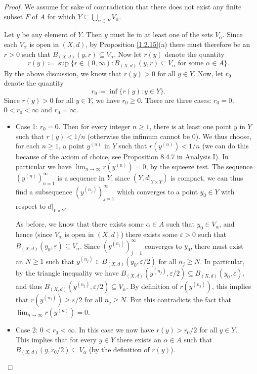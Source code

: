 \begin{proof}
    We assume for sake of contradiction that there does not exist any finite subset \(F\) of \(A\) for which \(Y \subseteq \bigcup_{\alpha \in F} V_{\alpha}\).

    Let \(y\) be any element of \(Y\).
    Then \(y\) must lie in at least one of the sets \(V_{\alpha}\).
    Since each \(V_{\alpha}\) is open in \((X, d)\), by Proposition \ref{1.2.15}(a) there must therefore be an \(r > 0\) such that \(B_{(X, d)}(y, r) \subseteq V_{\alpha}\).
    Now let \(r(y)\) denote the quantity
    \[
        r(y) \coloneqq \sup\big\{r \in (0, \infty) : B_{(X, d)}(y, r) \subseteq V_{\alpha} \text{ for some } \alpha \in A\big\}.
    \]
    By the above discussion, we know that \(r(y) > 0\) for all \(y \in Y\).
    Now, let \(r_0\) denote the quantity
    \[
        r_0 \coloneqq \inf\big\{r(y) : y \in Y\big\}.
    \]
    Since \(r(y) > 0\) for all \(y \in Y\), we have \(r_0 \geq 0\).
    There are three cases: \(r_0 = 0\), \(0 < r_0 < \infty\) and \(r_0 = \infty\).
    \begin{itemize}
        \item Case 1:
              \(r_0 = 0\).
              Then for every integer \(n \geq 1\), there is at least one point \(y\) in \(Y\) such that \(r(y) < 1 / n\) (otherwise the infimum cannot be \(0\)).
              We thus choose, for each \(n \geq 1\), a point \(y^{(n)}\) in \(Y\) such that \(r(y^{(n)}) < 1 / n\)
              (we can do this because of the axiom of choice, see Proposition 8.4.7 in Analysis I).
              In particular we have \(\lim_{n \to \infty} r(y^{(n)}) = 0\), by the squeeze test.
              The sequence \((y^{(n)})_{n = 1}^\infty\) is a sequence in \(Y\);
              since \((Y, d|_{Y \times Y})\) is compact, we can thus find a subsequence \((y^{(n_j)})_{j = 1}^\infty\) which converges to a point \(y_0 \in Y\) with respect to \(d|_{Y \times Y}\).

              As before, we know that there exists some \(\alpha \in A\) such that \(y_0 \in V_{\alpha}\), and hence (since \(V_{\alpha}\) is open in \((X, d)\)) there exists some \(\varepsilon > 0\) such that \(B_{(X, d)}(y_0, \varepsilon) \subseteq V_{\alpha}\).
              Since \((y^{(n_j)})_{j = 1}^\infty\) converges to \(y_0\), there must exist an \(N \geq 1\) such that \(y^{(n_j)} \in B_{(X, d)}(y_0, \varepsilon / 2)\) for all \(n_j \geq N\).
              In particular, by the triangle inequality we have \(B_{(X, d)}(y^{(n_j)}, \varepsilon / 2) \subseteq B_{(X, d)}(y_0, \varepsilon)\), and thus \(B_{(X, d)}(y^{(n_j)}, \varepsilon / 2) \subseteq V_{\alpha}\).
              By definition of \(r(y^{(n_j)})\), this implies that \(r(y^{(n_j)}) \geq \varepsilon / 2\) for all \(n_j \geq N\).
              But this contradicts the fact that \(\lim_{n \to \infty} r(y^{(n)}) = 0\).
        \item Case 2:
              \(0 < r_0 < \infty\).
              In this case we now have \(r(y) > r_0 / 2\) for all \(y \in Y\).
              This implies that for every \(y \in Y\) there exists an \(\alpha \in A\) such that \(B_{(X, d)}(y, r_0 / 2) \subseteq V_{\alpha}\) (by the definition of \(r(y)\)).


\end{itemize}
\end{proof}
